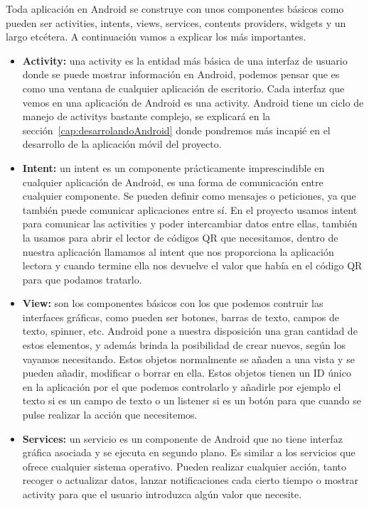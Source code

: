Toda aplicación en Android se construye con unos componentes básicos como pueden ser activities, intents, views, services, contents providers, widgets y un largo etcétera. A continuación vamos a explicar los más importantes.

\begin{itemize}

\item \textbf{Activity:} una activity es la entidad más básica de una interfaz de usuario donde se puede mostrar información en Android, podemos pensar que es como una ventana de cualquier aplicación de escritorio. Cada interfaz que vemos en una aplicación de Android es una activity. Android tiene un ciclo de manejo de activitys bastante complejo, se explicará en la sección~\ref{cap:desarrolandoAndroid} donde pondremos más incapié en el desarrollo de la aplicación móvil del proyecto.

\item \textbf{Intent:} un intent es un componente prácticamente imprescindible en cualquier aplicación de Android, es una forma de comunicación entre cualquier componente. Se pueden definir como mensajes o peticiones, ya que también puede comunicar aplicaciones entre sí. En el proyecto usamos intent para comunicar las activities y poder intercambiar datos entre ellas, también la usamos para abrir el lector de códigos QR que necesitamos, dentro de nuestra aplicación llamamos al intent que nos proporciona la aplicación lectora y cuando termine ella nos devuelve el valor que había en el código QR para que podamos tratarlo.

\item \textbf{View:} son los componentes básicos con los que podemos contruir las interfaces gráficas, como pueden ser botones, barras de texto, campos de texto, spinner, etc. Android pone a nuestra disposición una gran cantidad de estos elementos, y además brinda la posibilidad de crear nuevos, según los vayamos necesitando. Estos objetos normalmente se añaden a una vista y se pueden añadir, modificar o borrar en ella. Estos objetos tienen un ID único en la aplicación por el que podemos controlarlo y añadirle por ejemplo el texto si es un campo de texto o un listener si es un botón para que cuando se pulse realizar la acción que necesitemos.

\item \textbf{Services:} un servicio es un componente de Android que no tiene interfaz gráfica asociada y se ejecuta en segundo plano. Es similar a los servicios que ofrece cualquier sistema operativo. Pueden realizar cualquier acción, tanto recoger o actualizar datos, lanzar notificaciones cada cierto tiempo o mostrar activity para que el usuario introduzca algún valor que necesite.


\end{itemize}

